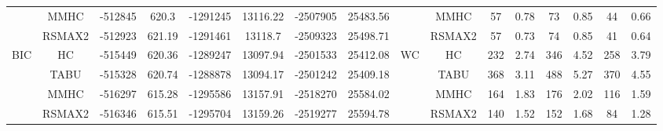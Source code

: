 \begin{table}[p]
{\begin{tabular}{cc||cc|cc|cc||cc|cc|cc|cc}
& MMHC &	-512845 & 	620.3 & 	-1291245 & 	13116.22 & 	-2507905 & 	25483.56 & 	& MMHC &	57 & 	0.78 & 	73 & 	0.85 & 	44 & 	0.66\tabularnewline													
& RSMAX2 &	-512923 & 	621.19 & 	-1291461 & 	13118.7 & 	-2509323 & 	25498.71 & 	& RSMAX2 &	57 & 	0.73 & 	74 & 	0.85 & 	41 & 	0.64\tabularnewline													
\hline																										
\multirow{4}{*}{BIC} & HC &	-515449 & 	620.36 & 	-1289247 & 	13097.94 & 	-2501533 & 	25412.08 & 	\multirow{4}{*}{WC} & HC &	232 & 	2.74 & 	346 & 	4.52 & 	258 & 	3.79\tabularnewline													
& TABU &	-515328 & 	620.74 & 	-1288878 & 	13094.17 & 	-2501242 & 	25409.18 & 	& TABU &	368 & 	3.11 & 	488 & 	5.27 & 	370 & 	4.55\tabularnewline													
& MMHC &	-516297 & 	615.28 & 	-1295586 & 	13157.91 & 	-2518270 & 	25584.02 & 	& MMHC &	164 & 	1.83 & 	176 & 	2.02 & 	116 & 	1.59\tabularnewline													
& RSMAX2 &	-516346 & 	615.51 & 	-1295704 & 	13159.26 & 	-2519277 & 	25594.78 & 	& RSMAX2 &	140 & 	1.52 & 	152 & 	1.68 & 	84 & 	1.28\tabularnewline													
\hline																										
\end{tabular}																										
}																										
\end{table}																										
